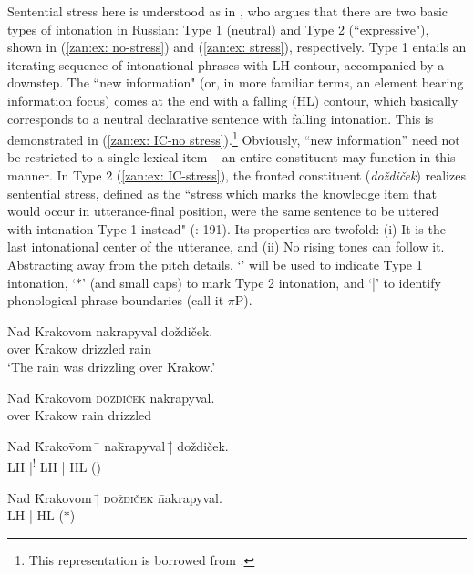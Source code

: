 \documentclass[output=paper,colorlinks,citecolor=brown]{langscibook}
\begin{document}
Sentential stress here is understood as in \citet{yokoyama1987discourse}, who argues that there are two basic types of intonation in Russian: Type 1 (neutral) and Type 2 (``expressive"), shown in (\ref{zan:ex: no-stress}) and (\ref{zan:ex: stress}), respectively. Type 1 entails an iterating sequence of intonational phrases with LH contour, accompanied by a downstep. The ``new information" (or, in more familiar terms, an element bearing information focus) comes at the end with a falling (HL) contour, which basically corresponds to a neutral declarative sentence with falling intonation. This is demonstrated in (\ref{zan:ex: IC-no stress}).\footnote{This representation is borrowed from \textcite{king1993configuring}.} Obviously, ``new information'' need not be restricted to a single lexical item -- an entire constituent may function in this manner. In Type 2 (\ref{zan:ex: IC-stress}), the fronted constituent (\textit{doždiček}) realizes sentential stress, defined as the ``stress which marks the knowledge item that would occur in utterance-final position, were the same sentence to be uttered with intonation Type 1 instead" (\citealt{yokoyama1987discourse}: 191). Its properties are twofold: (i) It is the last intonational center of the utterance, and (ii) No rising tones can follow it. Abstracting away from the pitch details, `\searrow' 
 will be used to indicate Type 1 intonation, `$\ast$' (and small caps) to mark Type 2 intonation, and `|' to identify phonological phrase boundaries (call it $\pi$P).

\ea
\ea\label{zan:ex: no-stress}
\gll Nad Krakovom nakrapyval doždiček.\\
   over Krakow drizzled rain\\
       \glt `The rain was drizzling over Krakow.' 
       
\ex \label{zan:ex: stress}
    \gll  Nad Krakovom \textsc{doždiček} nakrapyval.\\
    over Krakow rain drizzled\\
\z
\z

\ea
\ea \label{zan:ex: IC-no stress}

\begin{tabbing} Nad \= Krako\=vom \=| na\=krapyval \=| doždiček. \\ 
    \> LH  \>  \>|\textsuperscript{!}  \> LH  \> |  HL (\searrow) \end{tabbing}  

\ex \label{zan:ex: IC-stress}
\begin{tabbing}
     Nad \=Krakovom \= | \=  \textsc{doždiček }\= nakrapyval.\\
     \> LH \> | \>  HL ($\ast$)  \>  
\end{tabbing}
\z
\z
\end{document}
